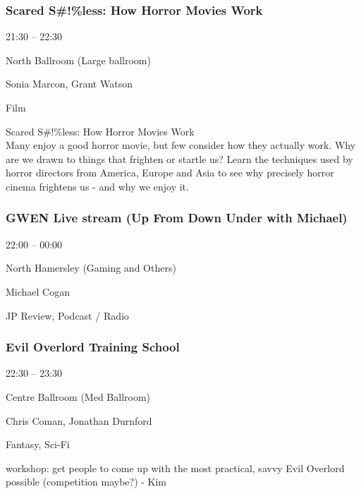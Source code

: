 \documentclass{scrreprt}
\begin{document}
\begin{multicols}{2}
\subsubsection*{Scared S\#!\%less: How Horror Movies Work}\begin{description}
\setlength{\itemsep}{0pt}
\setlength{\parsep}{0pt}
\setlength{\parskip}{0pt}
\item[Time:]{21:30 -- 22:30}
\item[Venue:]{North Ballroom (Large ballroom)}
\item[People:]{Sonia Marcon, Grant Watson}
\item[Tags:]{Film}\end{description}
Scared S\#!\%less: How Horror Movies Work\\Many enjoy a good horror movie, but few consider how they actually work. Why are we drawn to things that frighten or startle us? Learn the techniques used by horror directors from America, Europe and Asia to see why precisely horror cinema frightens us - and why we enjoy it.
\subsubsection*{GWEN Live stream (Up From Down Under with Michael)}\begin{description}
\setlength{\itemsep}{0pt}
\setlength{\parsep}{0pt}
\setlength{\parskip}{0pt}
\item[Time:]{22:00 -- 00:00}
\item[Venue:]{North Hamersley (Gaming and Others)}
\item[People:]{Michael Cogan}
\item[Tags:]{JP Review, Podcast / Radio}\end{description}

\subsubsection*{Evil Overlord Training School}\begin{description}
\setlength{\itemsep}{0pt}
\setlength{\parsep}{0pt}
\setlength{\parskip}{0pt}
\item[Time:]{22:30 -- 23:30}
\item[Venue:]{Centre Ballroom (Med Ballroom)}
\item[People:]{Chris Coman, Jonathan Durnford}
\item[Tags:]{Fantasy, Sci-Fi}\end{description}
workshop: get people to come up with the most practical, savvy Evil Overlord possible (competition maybe?) - Kim

\end{multicols}
\end{document}
